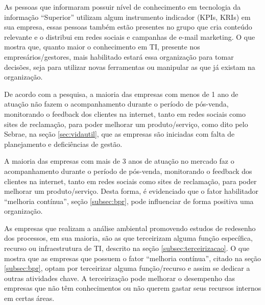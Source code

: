 As pessoas que informaram possuir nível de conhecimento em tecnologia da informação “Superior” utilizam algum instrumento indicador (KPIs, KRIs) em sua empresa, essas pessoas também estão presentes no grupo que cria conteúdo relevante e o distribui em redes sociais e campanhas de e-mail marketing. O que mostra que, quanto maior o conhecimento em TI, presente nos empresários/gestores, mais habilitado estará essa organização para tomar decisões, seja para utilizar novas ferramentas ou manipular as que já existam na organização.

De acordo com a pesquisa, a maioria das empresas com menos de 1 ano de atuação não fazem o acompanhamento durante o período de pós-venda, monitorando o feedback dos clientes na internet, tanto em redes sociais como sites de reclamação, para poder melhorar um produto/serviço, como dito pelo Sebrae, na seção \ref{sec:vidautil}, que as empresas são iniciadas com falta de planejamento e deficiências de gestão. 

A maioria das empresas com mais de 3 anos de atuação no mercado faz o acompanhamento durante o período de pós-venda, monitorando o feedback dos clientes na internet, tanto em redes sociais como sites de reclamação, para poder melhorar um produto/serviço. Desta forma, é evidenciado que o fator habilitador “melhoria contínua”, seção \ref{subsec:bpr}, pode influenciar de forma positiva uma organização.

As empresas que realizam a análise ambiental promovendo estudos de redesenho dos processos, em sua maioria, são as que terceirizam alguma função específica, recurso ou infraestrutura de TI, descrito na seção \ref{subsec:terceirizacao}. O que mostra que as empresas que possuem o fator “melhoria contínua”, citado na seção \ref{subsec:bpr}, optam por terceirizar alguma função/recurso e assim se dedicar a outras atividades chave. A terceirização pode melhorar o desempenho das empresas que não têm conhecimentos ou não querem gastar seus recursos internos em certas áreas.

